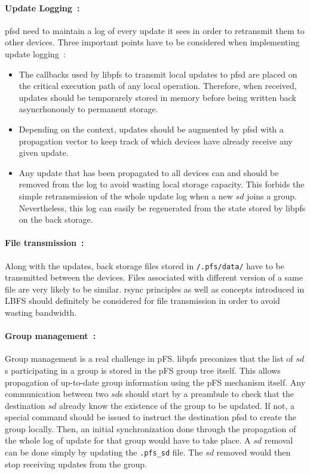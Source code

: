 \paragraph {Update Logging~:}
pfsd need to maintain a log of every update it sees in order to
retransmit them to other devices. Three important points have to be
considered when implementing update logging~:
\begin{itemize}
\item The callbacks used by libpfs to transmit local updates to pfsd are
  placed on the critical execution path of any local
  operation. Therefore, when received, updates should be temporarely
  stored in memory before being written back asyncrhonously to permanent
  storage.
\item Depending on the context, updates should be augmented by pfsd
  with a propagation vector to keep track of which devices have
  already receive any given update.
\item Any update that has been propagated to all devices can and
  should be removed from the log to avoid wasting local storage
  capacity. This forbids the simple retransmission of the whole update
  log when a new $sd$ joins a group. Nevertheless, this log can easily
  be regenerated from the state stored by libpfs on the back storage.
\end{itemize}

\paragraph {File transmission~:}
Along with the updates, back storage files stored in {\tt /.pfs/data/}
have to be transmitted between the devices. Files associated with
different version of a same file are very likely to be
similar. rsync\cite{tridgell:rsync} principles as well as concepts
introduced in LBFS\cite{muthitacharoen:lbfs} should definitely be
considered for file transmission in order to avoid wasting bandwidth.

\paragraph {Group management~:}
Group management is a real challenge in pFS. libpfs preconizes that
the list of $sd$s participating in a group is stored in the pFS group
tree itself. This allows propagation of up-to-date group information
using the pFS mechanism itself. Any communication between two $sd$s
should start by a preambule to check that the destination $sd$ already
know the existence of the group to be updated. If not, a special
command should be issued to instruct the destination pfsd to create the group
locally. Then, an initial synchronization done through the propagation
of the whole log of update for that group would  have to take place. A $sd$
removal can be done simply by updating the {\tt .pfs\_sd} file. The $sd$
removed would then stop receiving updates from the group.

